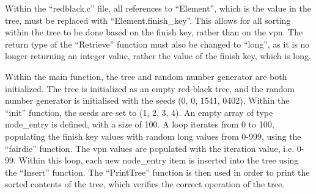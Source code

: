 Within the ``redblack.c'' file, all references to ``Element'', which is the
value in the tree, must be replaced with ``Element.finish\_key''. This allows
for all sorting within the tree to be done based on the finish key, rather than
on the vpn. The return type of the ``Retrieve'' function must also be changed to
``long'', as it is no longer returning an integer value, rather the value of the
finish key, which is long.

Within the main function, the tree and random number generator are both
initialized. The tree is initialized as an empty red-black tree, and the random
number generator is initialised with the seeds (0, 0, 1541, 0402). Within the
``init'' function, the seeds are set to (1, 2, 3, 4). An empty array of type
node\_entry is defined, with a size of 100. A loop iterates from 0 to
100, populating the finish key values with random long values from 0-999, using
the ``fairdie'' function. The vpn values are populated with the iteration value,
i.e. 0-99. Within this loop, each new node\_entry item is inserted into the tree
using the ``Insert'' function. The ``PrintTree'' function is then used in order
to print the sorted contents of the tree, which verifies the correct operation
of the tree.
